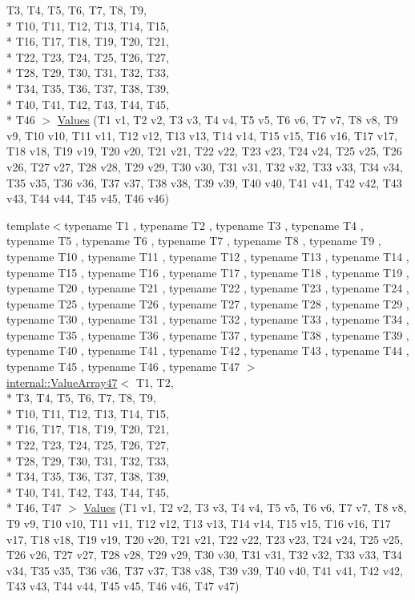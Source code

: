 \begin{DoxyCompactItemize}
T3, T4, T5, T6, T7, T8, T9, \\*
T10, T11, T12, T13, T14, T15, \\*
T16, T17, T18, T19, T20, T21, \\*
T22, T23, T24, T25, T26, T27, \\*
T28, T29, T30, T31, T32, T33, \\*
T34, T35, T36, T37, T38, T39, \\*
T40, T41, T42, T43, T44, T45, \\*
T46 $>$ \hyperlink{namespacetesting_a8f5536906a9d6780467c8ae53a420dad}{Values} (T1 v1, T2 v2, T3 v3, T4 v4, T5 v5, T6 v6, T7 v7, T8 v8, T9 v9, T10 v10, T11 v11, T12 v12, T13 v13, T14 v14, T15 v15, T16 v16, T17 v17, T18 v18, T19 v19, T20 v20, T21 v21, T22 v22, T23 v23, T24 v24, T25 v25, T26 v26, T27 v27, T28 v28, T29 v29, T30 v30, T31 v31, T32 v32, T33 v33, T34 v34, T35 v35, T36 v36, T37 v37, T38 v38, T39 v39, T40 v40, T41 v41, T42 v42, T43 v43, T44 v44, T45 v45, T46 v46)
\item 
{\footnotesize template$<$typename T1 , typename T2 , typename T3 , typename T4 , typename T5 , typename T6 , typename T7 , typename T8 , typename T9 , typename T10 , typename T11 , typename T12 , typename T13 , typename T14 , typename T15 , typename T16 , typename T17 , typename T18 , typename T19 , typename T20 , typename T21 , typename T22 , typename T23 , typename T24 , typename T25 , typename T26 , typename T27 , typename T28 , typename T29 , typename T30 , typename T31 , typename T32 , typename T33 , typename T34 , typename T35 , typename T36 , typename T37 , typename T38 , typename T39 , typename T40 , typename T41 , typename T42 , typename T43 , typename T44 , typename T45 , typename T46 , typename T47 $>$ }\\\hyperlink{classtesting_1_1internal_1_1_value_array47}{internal\-::\-Value\-Array47}$<$ T1, T2, \\*
T3, T4, T5, T6, T7, T8, T9, \\*
T10, T11, T12, T13, T14, T15, \\*
T16, T17, T18, T19, T20, T21, \\*
T22, T23, T24, T25, T26, T27, \\*
T28, T29, T30, T31, T32, T33, \\*
T34, T35, T36, T37, T38, T39, \\*
T40, T41, T42, T43, T44, T45, \\*
T46, T47 $>$ \hyperlink{namespacetesting_aba2697b2cd3e9d667ab3807022303240}{Values} (T1 v1, T2 v2, T3 v3, T4 v4, T5 v5, T6 v6, T7 v7, T8 v8, T9 v9, T10 v10, T11 v11, T12 v12, T13 v13, T14 v14, T15 v15, T16 v16, T17 v17, T18 v18, T19 v19, T20 v20, T21 v21, T22 v22, T23 v23, T24 v24, T25 v25, T26 v26, T27 v27, T28 v28, T29 v29, T30 v30, T31 v31, T32 v32, T33 v33, T34 v34, T35 v35, T36 v36, T37 v37, T38 v38, T39 v39, T40 v40, T41 v41, T42 v42, T43 v43, T44 v44, T45 v45, T46 v46, T47 v47)

\end{DoxyCompactItemize}
